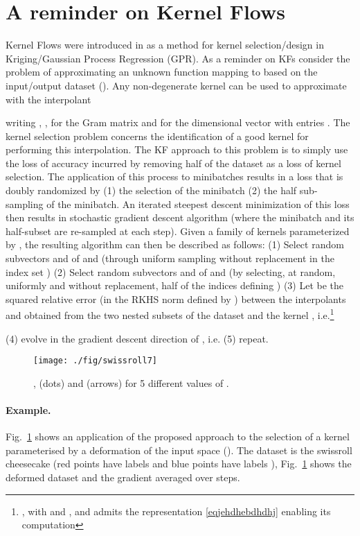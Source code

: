 \documentclass[11pt]{article}
\begin{document}
\section{A reminder on Kernel Flows}

 Kernel Flows were introduced in \cite{owhadi2019kernel} as a method for kernel selection/design in Kriging/Gaussian Process Regression (GPR).
 As a reminder on KFs consider the problem of approximating an unknown function  mapping  to    based on the input/output dataset  ().
 Any non-degenerate kernel  can be used to approximate  with the interpolant
 
writing , ,  for the  Gram matrix  and  for the  dimensional vector with entries .
 The kernel selection problem concerns the identification of a good kernel for performing this interpolation. The KF approach to this problem is to simply use the loss of accuracy incurred by removing half of the dataset as a loss of kernel selection. The application of this process to minibatches results in a loss that is doubly randomized by (1) the selection of the minibatch (2) the half sub-sampling of the minibatch. An iterated steepest descent minimization of this loss then results in stochastic  gradient descent algorithm (where the minibatch and its half-subset  are re-sampled at each step).
 Given a family of kernels  parameterized by , the resulting algorithm can then be described as follows:
 (1) Select random subvectors  and  of  and  (through uniform sampling without replacement in the index set ) (2) Select random subvectors  and  of  and  (by selecting, at random, uniformly and without replacement, half of the indices defining ) (3) Let  be the squared relative error (in the RKHS norm  defined by )  between
 the interpolants  and  obtained from the two nested subsets of the dataset and the kernel , i.e.\footnote{ , with  and , and   admits \cite[Prop.~13.29]{owhadi2019operator} the representation \eqref{eqjehdhebdhdhj} enabling its computation}
 
 (4) evolve  in the gradient descent direction of , i.e.  (5) repeat.

\begin{figure}[h]
\begin{center}
\texttt{[image: ./fig/swissroll7]}
\caption{\cite[Fig.~13]{owhadi2019kernel},  (dots) and  (arrows) for 5 different values of .
}
\label{figswissroll7}
\end{center}
\end{figure}

\paragraph{Example.}
Fig.~\ref{figswissroll7} shows an application of the proposed approach to the selection of a kernel
 parameterised by a deformation  of the input space ().
The dataset is the swissroll cheesecake (red points have labels  and blue points have labels ), Fig.~\ref{figswissroll7} shows the deformed dataset  and the gradient   averaged over  steps.
\end{document}

